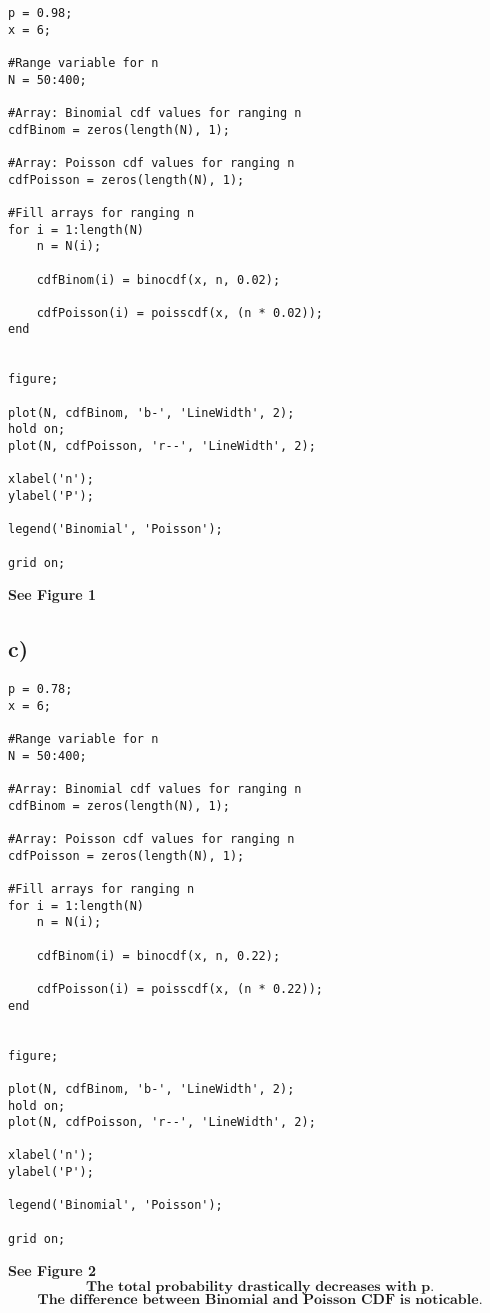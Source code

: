 \documentclass[12pt]{article}
\begin{document}
\begin{lstlisting}
p = 0.98;
x = 6;

#Range variable for n
N = 50:400;

#Array: Binomial cdf values for ranging n
cdfBinom = zeros(length(N), 1);

#Array: Poisson cdf values for ranging n
cdfPoisson = zeros(length(N), 1);

#Fill arrays for ranging n
for i = 1:length(N)
    n = N(i);
    
    cdfBinom(i) = binocdf(x, n, 0.02);
    
    cdfPoisson(i) = poisscdf(x, (n * 0.02));
end


figure;

plot(N, cdfBinom, 'b-', 'LineWidth', 2);
hold on;
plot(N, cdfPoisson, 'r--', 'LineWidth', 2);

xlabel('n');
ylabel('P');

legend('Binomial', 'Poisson');

grid on;
\end{lstlisting}

\textbf{See Figure 1}

\subsection*{c)} 
\begin{lstlisting}
p = 0.78;
x = 6;

#Range variable for n
N = 50:400;

#Array: Binomial cdf values for ranging n
cdfBinom = zeros(length(N), 1);

#Array: Poisson cdf values for ranging n
cdfPoisson = zeros(length(N), 1);

#Fill arrays for ranging n
for i = 1:length(N)
    n = N(i);
    
    cdfBinom(i) = binocdf(x, n, 0.22);
    
    cdfPoisson(i) = poisscdf(x, (n * 0.22));
end


figure;

plot(N, cdfBinom, 'b-', 'LineWidth', 2);
hold on;
plot(N, cdfPoisson, 'r--', 'LineWidth', 2);

xlabel('n');
ylabel('P');

legend('Binomial', 'Poisson');

grid on;
\end{lstlisting}

\textbf{See Figure 2}
\[\textbf{The total probability drastically decreases with p.} \]
\[\textbf{The difference between Binomial and Poisson CDF is noticable.} \]
\end{document}
